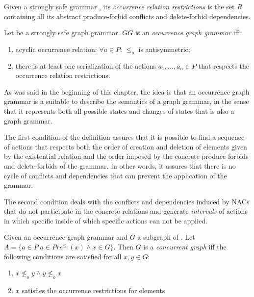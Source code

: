 \begin{definition} Given a strongly safe grammar \doublyTypedGraphGrammarCore{}, its \emph{occurrence relation restrictions} is the set $R$ containing all its abstract produce-forbid conflicts and delete-forbid dependencies.
\end{definition}

\begin{definition} Let \doublyTypedGraphGrammarCore{} be a strongly safe graph grammar. $GG$ is an \emph{occurrence graph grammar} iff:

  \begin{enumerate}
    \item acyclic occurrence relation: $\forall a \in P$: $\leq_o$ is antisymmetric;
    \item there is at least one serialization of the actions $a_1,\ldots,a_n \in P$ that respects the occurrence relation restrictions.
  \end{enumerate}
\end{definition}

As was said in the beginning of this chapter, the idea is that an occurrence graph grammar is a suitable to describe the semantics of a graph grammar, in the sense that it represents both all possible states and changes of states that is also a graph grammar.

The first condition of the definition assures that it is possible to find a sequence of actions that respects both the order of creation and deletion of elements given by the existential relation and the order imposed by the concrete produce-forbids and delete-forbids of the grammar. In other words, it assures that there is no cycle of conflicts and dependencies that can prevent the application of the grammar.

The second condition deals with the conflicts and dependencies induced by NACs that do not participate in the concrete relations and generate \emph{intervals} of actions in which specific inside of which specific actions can not be applied.


\begin{definition} Given \doublyTypedGraphGrammarCore{} an occurrence graph grammar and $G$ a subgraph of \coreGraph{}. Let \mbox{$A = \{a \in P | a\in Pre^{\leq_o}(x) \land x \in G\}$}. Then $G$ is a \emph{concurrent graph} iff the following conditions are satisfied for all $x,y \in G$:

\begin{enumerate}
  \item $x \not\leq_o y \land y \not\leq_o x$
  \item $x$ satisfies the occurrence restrictions for elements
\end{enumerate}

\end{definition}

